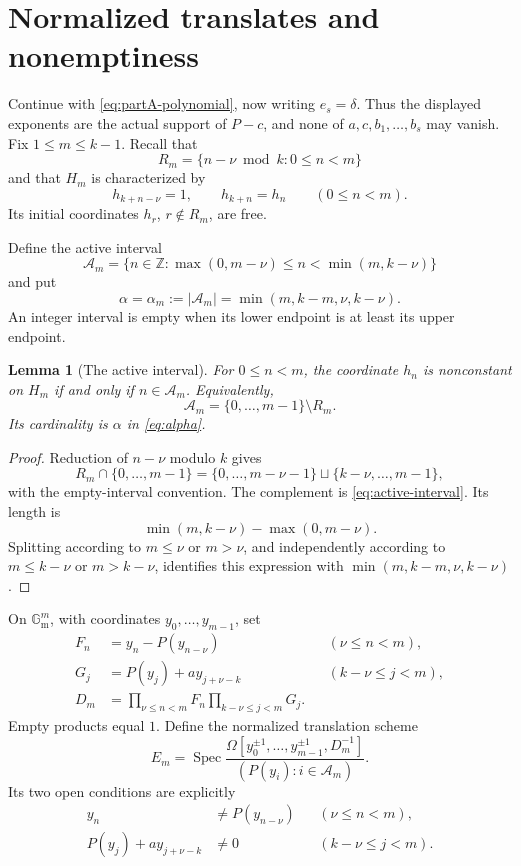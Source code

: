 \documentclass[11pt]{article}
\newcommand{\Gm}{\mathbb{G}_{\mathrm m}}
\newcommand{\Z}{\mathbb{Z}}
\newcommand{\Om}{\Omega}
\newcommand{\Spec}{\operatorname{Spec}}
\newtheorem{lemma}{Lemma}[section]
\theoremstyle{remark}
\numberwithin{equation}{section}
\begin{document}
\section{Normalized translates and nonemptiness}\label{sec:normalized-scheme}

Continue with \eqref{eq:partA-polynomial}, now writing \(e_s=\delta\).  Thus the displayed exponents are the actual support of \(P-c\), and none of \(a,c,b_1,\ldots,b_s\) may vanish.  Fix \(1\leq m\leq k-1\).  Recall that
\[
 R_m=\{n-\nu\bmod k:0\leq n<m\}
\]
and that \(H_m\) is characterized by
\[
 h_{k+n-\nu}=1,\qquad h_{k+n}=h_n\qquad(0\leq n<m).
\]
Its initial coordinates \(h_r\), \(r\notin R_m\), are free.

Define the active interval
\begin{equation}\label{eq:active-interval}
 \mathcal A_m=
 \{n\in\Z:\max(0,m-\nu)\leq n<\min(m,k-\nu)\}
\end{equation}
and put
\begin{equation}\label{eq:alpha}
 \alpha=\alpha_m:=|\mathcal A_m|
 =\min(m,k-m,\nu,k-\nu).
\end{equation}
An integer interval is empty when its lower endpoint is at least its upper endpoint.

\begin{lemma}[The active interval]\label{lem:active-interval}
For \(0\leq n<m\), the coordinate \(h_n\) is nonconstant on \(H_m\) if and only if \(n\in\mathcal A_m\).  Equivalently,
\[
 \mathcal A_m=\{0,\ldots,m-1\}\setminus R_m.
\]
Its cardinality is \(\alpha\) in \eqref{eq:alpha}.
\end{lemma}

\begin{proof}
Reduction of \(n-\nu\) modulo \(k\) gives
\[
 R_m\cap\{0,\ldots,m-1\}
 =
 \{0,\ldots,m-\nu-1\}\sqcup\{k-\nu,\ldots,m-1\},
\]
with the empty-interval convention.  The complement is \eqref{eq:active-interval}.  Its length is
\[
 \min(m,k-\nu)-\max(0,m-\nu).
\]
Splitting according to \(m\leq\nu\) or \(m>\nu\), and independently according to \(m\leq k-\nu\) or \(m>k-\nu\), identifies this expression with \(\min(m,k-m,\nu,k-\nu)\).
\end{proof}

On \(\Gm^m\), with coordinates \(y_0,\ldots,y_{m-1}\), set
\begin{align}
 F_n&=y_n-P(y_{n-\nu}) &&(\nu\leq n<m), \label{eq:F-open}\\
 G_j&=P(y_j)+a y_{j+\nu-k} &&(k-\nu\leq j<m), \label{eq:G-open}\\
 D_m&=\prod_{\nu\leq n<m}F_n\prod_{k-\nu\leq j<m}G_j.
 \label{eq:D-open}
\end{align}
Empty products equal \(1\).  Define the normalized translation scheme
\begin{equation}\label{eq:Em-definition}
 E_m=\Spec
 \frac{\Om[y_0^{\pm1},\ldots,y_{m-1}^{\pm1},D_m^{-1}]}
      {(P(y_i):i\in\mathcal A_m)}.
\end{equation}
Its two open conditions are explicitly
\begin{align}
 y_n&\neq P(y_{n-\nu}) &&(\nu\leq n<m), \label{eq:first-open}\\
 P(y_j)+a y_{j+\nu-k}&\neq0 &&(k-\nu\leq j<m).
 \label{eq:second-open}
\end{align}
\end{document}
